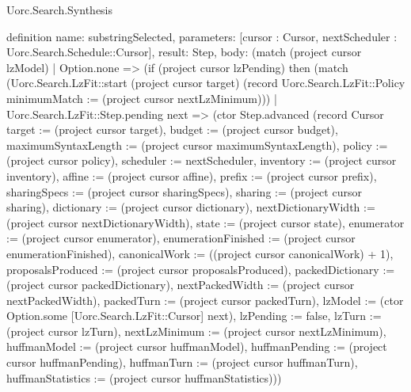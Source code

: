 \begin{lexlean}{Uorc.Search.Synthesis}
\begin{semanticmodule}
definition{
  name: substringSelected,
  parameters: [cursor : Cursor, nextScheduler : Uorc.Search.Schedule::Cursor],
  result: Step,
  body: (match (project cursor lzModel)
    | Option.none => (if (project cursor lzPending) then (match (Uorc.Search.LzFit::start (project cursor target) (record Uorc.Search.LzFit::Policy {minimumMatch := (project cursor nextLzMinimum)}))
      | Uorc.Search.LzFit::Step.pending next => (ctor Step.advanced (record Cursor {target := (project cursor target), budget := (project cursor budget), maximumSyntaxLength := (project cursor maximumSyntaxLength), policy := (project cursor policy), scheduler := nextScheduler, inventory := (project cursor inventory), affine := (project cursor affine), prefix := (project cursor prefix), sharingSpecs := (project cursor sharingSpecs), sharing := (project cursor sharing), dictionary := (project cursor dictionary), nextDictionaryWidth := (project cursor nextDictionaryWidth), state := (project cursor state), enumerator := (project cursor enumerator), enumerationFinished := (project cursor enumerationFinished), canonicalWork := ((project cursor canonicalWork) + 1), proposalsProduced := (project cursor proposalsProduced), packedDictionary := (project cursor packedDictionary), nextPackedWidth := (project cursor nextPackedWidth), packedTurn := (project cursor packedTurn), lzModel := (ctor Option.some [Uorc.Search.LzFit::Cursor] next), lzPending := false, lzTurn := (project cursor lzTurn), nextLzMinimum := (project cursor nextLzMinimum), huffmanModel := (project cursor huffmanModel), huffmanPending := (project cursor huffmanPending), huffmanTurn := (project cursor huffmanTurn), huffmanStatistics := (project cursor huffmanStatistics)}))
}
\end{semanticmodule}
\end{lexlean}
